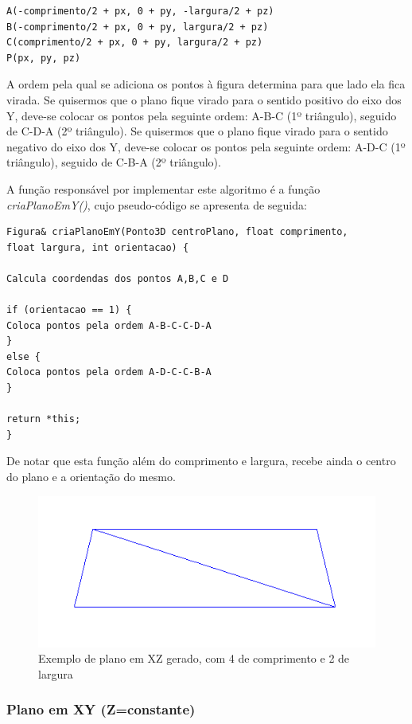 \begin{Verbatim}
A(-comprimento/2 + px, 0 + py, -largura/2 + pz)
B(-comprimento/2 + px, 0 + py, largura/2 + pz)
C(comprimento/2 + px, 0 + py, largura/2 + pz)
P(px, py, pz)
\end{Verbatim}

A ordem pela qual se adiciona os pontos à figura determina para que lado ela fica virada. Se quisermos que o plano fique virado para o sentido positivo do eixo dos Y, deve-se colocar os pontos pela seguinte ordem: A-B-C (1º triângulo), seguido de C-D-A (2º triângulo). Se quisermos que o plano fique virado para o sentido negativo do eixo dos Y, deve-se colocar os pontos pela seguinte ordem: A-D-C (1º triângulo), seguido de C-B-A (2º triângulo).

A função responsável por implementar este algoritmo é a função \textit{criaPlanoEmY()}, cujo pseudo-código se apresenta de seguida:

\begin{Verbatim}
Figura& criaPlanoEmY(Ponto3D centroPlano, float comprimento, 
float largura, int orientacao) {

Calcula coordendas dos pontos A,B,C e D

if (orientacao == 1) {
Coloca pontos pela ordem A-B-C-C-D-A
}
else {
Coloca pontos pela ordem A-D-C-C-B-A
}

return *this;
}
\end{Verbatim}

De notar que esta função além do comprimento e largura, recebe ainda o centro do plano e a orientação do mesmo.

\begin{figure}[<+htpb+>]
	\centering
	\includegraphics[scale=0.5]{imagens/p3_plano_4_2.png}
	\caption{Exemplo de plano em XZ gerado, com 4 de comprimento e 2 de largura}
	\label{p1:fig:p3_plano_4_2}
\end{figure}

\subsubsection{Plano em XY (Z=constante)}

